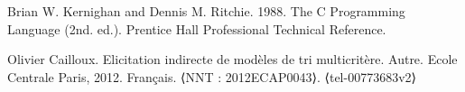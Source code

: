 \renewcommand{\refname}{Bibliography}

\begin{thebibliography}{99}

Brian W. Kernighan and Dennis M. Ritchie. 1988. The C Programming Language (2nd. ed.). Prentice Hall Professional Technical Reference.

Olivier Cailloux. Elicitation indirecte de modèles de tri multicritère. Autre. Ecole Centrale Paris, 2012. Français. ⟨NNT : 2012ECAP0043⟩. ⟨tel-00773683v2⟩


\end{thebibliography}